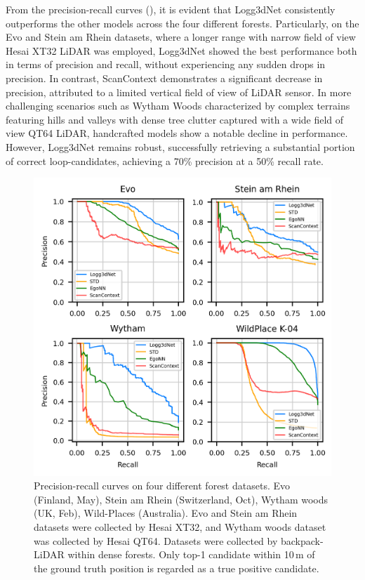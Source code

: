 From the precision-recall curves (), it is evident that Logg3dNet consistently outperforms the other models across the four different forests. Particularly, on the Evo and Stein am Rhein datasets, where a longer range with narrow field of view Hesai XT32 LiDAR was employed, Logg3dNet showed the best performance both in terms of precision and recall, without experiencing any sudden drops in precision.
In contrast, ScanContext demonstrates a significant decrease in precision, attributed to a limited vertical field of view of LiDAR sensor. In more challenging scenarios such as Wytham Woods characterized by complex terrains featuring hills and valleys with dense tree clutter captured with a wide field of view QT64 LiDAR, handcrafted models show a notable decline in performance. However, Logg3dNet remains robust, successfully retrieving a substantial portion of correct loop-candidates, achieving a 70\% precision at a 50\% recall rate. 
\begin{figure}[htbp]
  \centering
  \includegraphics[width=0.9\linewidth]{pics/exp_1.1_pr_curves}
  \caption{Precision-recall curves on four different forest datasets. Evo (Finland, May), Stein am Rhein (Switzerland, Oct), Wytham woods (UK, Feb), Wild-Places \cite{knights2023icra} (Australia).
  Evo and Stein am Rhein datasets were collected by Hesai XT32, and Wytham woods dataset was collected by Hesai QT64. Datasets were collected by backpack-LiDAR within dense forests. Only top-1 candidate within 10\,m of the ground truth position is regarded as a true positive candidate.}
  \label{fig:pr_curves}
\end{figure}
